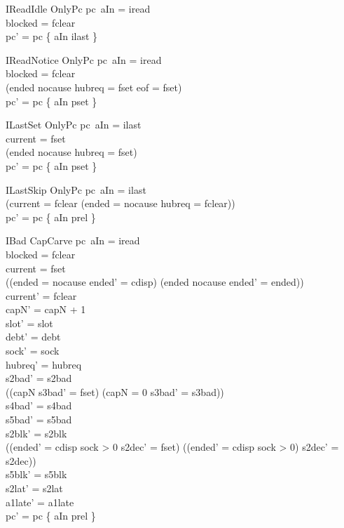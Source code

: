 \documentclass[a4paper,10pt,fleqn]{article}
\begin{document}
\begin{schema}{IReadIdle}
  OnlyPc
\where
  pc~aIn = iread \\
  blocked = fclear \\
  pc' = pc \oplus \{ aIn \mapsto ilast \}
\end{schema}

\begin{schema}{IReadNotice}
  OnlyPc
\where
  pc~aIn = iread \\
  blocked = fclear \\
  (ended \neq nocause \lor hubreq = fset \lor eof = fset) \\
  pc' = pc \oplus \{ aIn \mapsto pset \}
\end{schema}

\begin{schema}{ILastSet}
  OnlyPc
\where
  pc~aIn = ilast \\
  current = fset \\
  (ended \neq nocause \lor hubreq = fset) \\
  pc' = pc \oplus \{ aIn \mapsto pset \}
\end{schema}

\begin{schema}{ILastSkip}
  OnlyPc
\where
  pc~aIn = ilast \\
  (current = fclear \lor (ended = nocause \land hubreq = fclear)) \\
  pc' = pc \oplus \{ aIn \mapsto prel \}
\end{schema}

\begin{schema}{IBad}
  CapCarve
\where
  pc~aIn = iread \\
  blocked = fclear \\
  current = fset \\
  ((ended = nocause \land ended' = cdisp) \lor (ended \neq nocause \land ended' = ended)) \\
  current' = fclear \\
  capN' = capN + 1 \\
  slot' = slot \\
  debt' = debt \\
  sock' = sock \\
  hubreq' = hubreq \\
  s2bad' = s2bad \\
  ((capN  \land s3bad' = fset) \lor (capN = 0 \land s3bad' = s3bad)) \\
  s4bad' = s4bad \\
  s5bad' = s5bad \\
  s2blk' = s2blk \\
  ((ended' = cdisp \land sock > 0 \land s2dec' = fset) \lor
    (\lnot (ended' = cdisp \land sock > 0) \land s2dec' = s2dec)) \\
  s5blk' = s5blk \\
  s2lat' = s2lat \\
  a1late' = a1late \\
  pc' = pc \oplus \{ aIn \mapsto prel \}
\end{schema}
\end{document}
